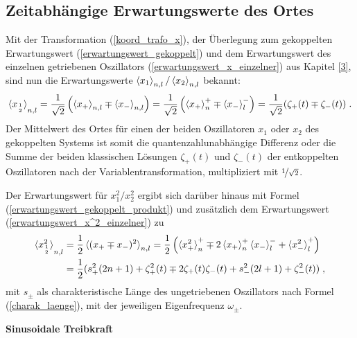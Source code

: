   \subsection{Zeitabhängige Erwartungswerte des Ortes}
    Mit der Transformation (\ref{koord_trafo_x}), der Überlegung zum gekoppelten Erwartungswert (\ref{erwartungswert_gekoppelt}) und dem Erwartungswert des einzelnen getriebenen Oszillators (\ref{erwartungswert_x_einzelner}) aus Kapitel \ref{3}, sind nun die Erwartungswerte
    $\braket{x_1}_{n,l}/\braket{x_2}_{n,l}$ bekannt:
    \begin{align}
      \braket{x_{1 \atop 2}}_{n,l}=\frac{1}{\sqrt{2}}\left(\braket{x_+}_{n,l}\mp\braket{x_-}_{n,l}\right)
      =\frac{1}{\sqrt{2}}\left(\braket{x_+}_n^+\mp\braket{x_-}_l^-\right)
      =\frac{1}{\sqrt{2}}(\zeta_+(t)\mp\zeta_-(t)) \; .
    \end{align}
    Der Mittelwert des Ortes für einen der beiden Oszillatoren $x_1$ oder $x_2$ des gekoppelten Systems ist somit die quantenzahlunabhängige Differenz oder die Summe der beiden klassischen Lösungen $\zeta_+(t)$ und $\zeta_-(t)$ der entkoppelten Oszillatoren nach der Variablentransformation, multipliziert mit $\nicefrac{1}{\sqrt 2}$.

    Der Erwartungswert für $x_{1}^2/x_2^2$ ergibt sich darüber hinaus mit Formel (\ref{erwartungswert_gekoppelt_produkt}) und zusätzlich dem Erwartungswert (\ref{erwartungswert_x^2_einzelner}) zu
    \begin{align}
      \braket{x_{1\atop 2}^2}_{n,l}&=\frac{1}{2}\braket{(x_+\mp x_-)^2}_{n,l}
      =\frac{1}{2}\left(\braket{x_+^2}_n^+ \mp 2\braket{x_+}_n^+\braket{x_-}_l^- + \braket{x_-^2}_l^+\right) \notag\\
      &=\frac 1 2 (s_+^2(2n+1)+\zeta_+^2(t) \mp 2\zeta_+(t)\zeta_-(t) + s_-^2(2l+1)+\zeta_-^2(t)) \; ,
    \end{align}
    mit $s_\pm$ als charakteristische Länge des ungetriebenen Oszillators nach Formel (\ref{charak_laenge}), mit der jeweiligen Eigenfrequenz $\omega_\pm$.

    \textbf{Sinusoidale Treibkraft}

